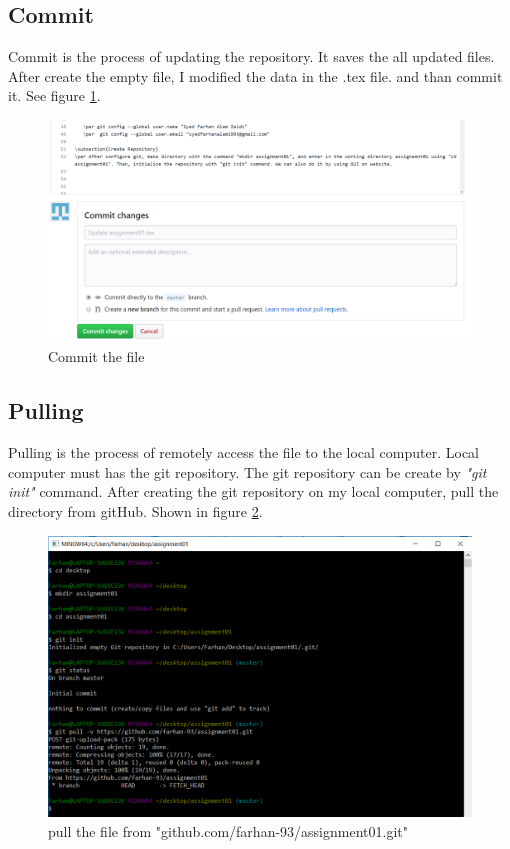 \documentclass[paper=a4, fontsize=12pt]{scrartcl}
\numberwithin{equation}{section} %
\numberwithin{figure}{section} %
\numberwithin{table}{section} %
\begin{document}
\subsection{Commit}
Commit is the process of updating the repository. It saves the all updated files. After create the empty file, I modified the data in the .tex file. and than commit it. See figure \ref{ccom}.

\begin{figure}
\includegraphics[width=\linewidth]{Commit.PNG}
\caption{Commit the file}
\label{ccom}
\end{figure}


\subsection{Pulling}
Pulling is the process of remotely access the file to the local computer. Local computer must has the git repository. 
The git repository can be create by \textit{"git init"} command. After creating the git repository on my local computer, pull the directory from gitHub. Shown in figure \ref{cpull}.



\begin{figure}
\includegraphics[width=\linewidth]{pull.png}
\caption{pull the file from "github.com/farhan-93/assignment01.git"}
\label{cpull}
\end{figure}
\end{document}
